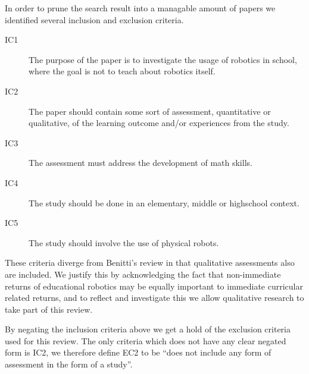 \bigskip\noindent
In order to prune the search result into a managable amount of papers we identified several inclusion and exclusion criteria. 
\begin{description}
	\item[IC1] The purpose of the paper is to investigate the usage of robotics in school, where the goal is not to teach about robotics itself.
	\item[IC2] The paper should contain some sort of assessment, quantitative or qualitative, of the learning outcome and/or experiences from the study. 
	\item[IC3] The assessment must address the development of math skills. 
	\item[IC4] The study should be done in an elementary, middle or highschool context.
	\item[IC5] The study should involve the use of physical robots.
\end{description}
These criteria diverge from Benitti's review in that qualitative assessments also are included. 
We justify this by acknowledging the fact that non-immediate returns of educational robotics may be equally important to immediate curricular related returns,
and to reflect and investigate this we allow qualitative research to take part of this review. 	

\bigskip\noindent
By negating the inclusion criteria above we get a hold of the exclusion criteria used for this review. 
The only criteria which does not have any clear negated form is IC2, we therefore define EC2 to be "`does not include any form of assessment in the form of a study"'. 



